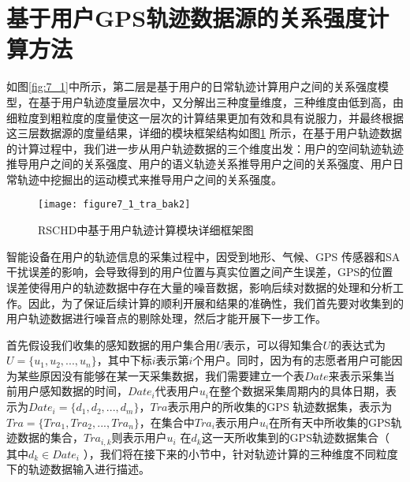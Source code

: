 \section{基于用户GPS轨迹数据源的关系强度计算方法}
\label{sec:section4-1}
如图\ref{fig:7_1}中所示，第二层是基于用户的日常轨迹计算用户之间的关系强度模型，在基于用户轨迹度量层次中，又分解出三种度量维度，三种维度由低到高，由细粒度到粗粒度的度量使这一层次的计算结果更加有效和具有说服力，并最终根据这三层数据源的度量结果，详细的模块框架结构如图\ref{fig:7_1_tra} 所示，在基于用户轨迹数据的计算过程中，我们进一步从用户轨迹数据的三个维度出发：用户的空间轨迹轨迹推导用户之间的关系强度、用户的语义轨迹关系推导用户之间的关系强度、用户日常轨迹中挖掘出的运动模式来推导用户之间的关系强度。
\begin{figure}[htp]
\centering
\texttt{[image: figure7\_1\_tra\_bak2]}
\caption{RSCHD中基于用户轨迹计算模块详细框架图}
\label{fig:7_1_tra}
\end{figure}

\par 智能设备在用户的轨迹信息的采集过程中，因受到地形、气候、GPS 传感器和SA干扰误差的影响，会导致得到的用户位置与真实位置之间产生误差，GPS的位置误差使得用户的轨迹数据中存在大量的噪音数据，影响后续对数据的处理和分析工作。因此，为了保证后续计算的顺利开展和结果的准确性，我们首先要对收集到的用户轨迹数据进行噪音点的剔除处理，然后才能开展下一步工作。
\par 首先假设我们收集的感知数据的用户集合用$U$表示，可以得知集合$U$的表达式为$U=\{u_{1},u_{2},...,u_{n}\}$，其中下标$i$表示第$i$个用户。同时，因为有的志愿者用户可能因为某些原因没有能够在某一天采集数据，我们需要建立一个表$Date$来表示采集当前用户感知数据的时间，$Date_{i}$代表用户$u_{i}$在整个数据采集周期内的具体日期，表示为$Date_{i}=\{d_{1},d_{2},...,d_{m}\}$，$Tra$表示用户的所收集的GPS 轨迹数据集，表示为$Tra=\{Tra_{1},Tra_{2},...,Tra_{n}\}$，在集合中$Tra_{i}$表示用户$u_{i}$在所有天中所收集的GPS轨迹数据的集合，$Tra_{i,k}$则表示用户$u_{i}$ 在$d_{k}$这一天所收集到的GPS轨迹数据集合（ 其中$ d_{k} \in Date_{i}$ ），我们将在接下来的小节中，针对轨迹计算的三种维度不同粒度下的轨迹数据输入进行描述。


